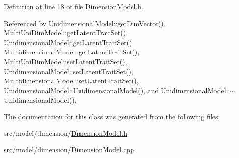 Definition at line 18 of file Dimension\+Model.\+h.



Referenced by Unidimensional\+Model\+::get\+Dim\+Vector(), Multi\+Uni\+Dim\+Model\+::get\+Latent\+Trait\+Set(), Unidimensional\+Model\+::get\+Latent\+Trait\+Set(), Multidimensional\+Model\+::get\+Latent\+Trait\+Set(), Multi\+Uni\+Dim\+Model\+::set\+Latent\+Trait\+Set(), Unidimensional\+Model\+::set\+Latent\+Trait\+Set(), Multidimensional\+Model\+::set\+Latent\+Trait\+Set(), Unidimensional\+Model\+::\+Unidimensional\+Model(), and Unidimensional\+Model\+::$\sim$\+Unidimensional\+Model().



The documentation for this class was generated from the following files\+:\begin{DoxyCompactItemize}
\item 
src/model/dimension/\hyperlink{DimensionModel_8h}{Dimension\+Model.\+h}\item 
src/model/dimension/\hyperlink{DimensionModel_8cpp}{Dimension\+Model.\+cpp}\end{DoxyCompactItemize}
